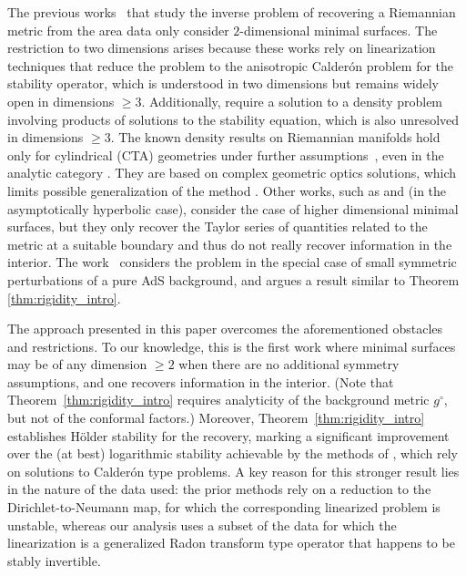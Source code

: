 \documentclass[11pt]{amsart}
\theoremstyle{definition}
\numberwithin{equation}{section}
\begin{document}
The previous works~\cite{Tracey, carstea2024calder, carstea2024inverse}  that study the inverse problem of recovering a Riemannian metric from the area data only consider $2$-dimensional minimal surfaces. The restriction to two dimensions arises because these works rely on linearization techniques that reduce the problem to the anisotropic Calder\'on problem for the stability operator, which is understood in two dimensions but remains widely open in dimensions $\geq 3$. Additionally, \cite{carstea2024calder, carstea2024inverse} require a solution to a density problem involving products of solutions to the stability equation, which is also unresolved in dimensions $\geq 3$. The known density results on Riemannian manifolds hold only for cylindrical (CTA) geometries under further assumptions~\cite{dos2009limiting}, even in the analytic category \cite{KLS22}. They are based on complex geometric optics solutions, which limits possible generalization of the method  \cite{LS12}. Other works, such as \cite{nurminen2023inverse, nurminen2024inverse} and \cite{marxkuo2024inverseproblemrenormalizedarea} (in the asymptotically hyperbolic case), consider the case of higher dimensional minimal surfaces, but they only recover the Taylor series of quantities related to the metric at a suitable boundary and thus do not really recover information in the interior. The work~\cite{jokela2025bulk} considers the problem in the special case of small symmetric perturbations of a pure AdS background, and argues a result similar to Theorem \ref{thm:rigidity_intro}.

The approach presented in this paper overcomes the aforementioned obstacles and restrictions. To our knowledge, this is the first work where minimal surfaces may be of any dimension $\geq 2$ when there are no additional symmetry assumptions, and one recovers information in the interior. (Note that Theorem~\ref{thm:rigidity_intro} requires analyticity of the background metric ${g}^\circ$, but not of the conformal factors.) 
Moreover, Theorem~\ref{thm:rigidity_intro} establishes H\"older stability for the recovery, marking a significant improvement over the (at best) logarithmic stability achievable by the methods of \cite{Tracey, carstea2024calder, carstea2024inverse}, which rely on solutions to Calderón type problems. A key reason for this stronger result lies in the nature of the data used: the prior methods rely on a reduction to the Dirichlet-to-Neumann map, for which the corresponding linearized problem is unstable, whereas our analysis uses a subset of the data for which the linearization is a generalized Radon transform type operator that happens to be stably invertible. 
\end{document}
